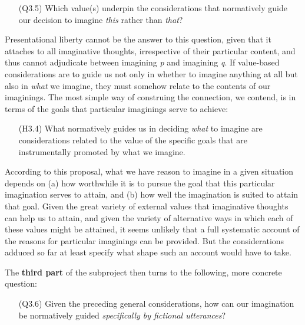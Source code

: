 \vspace{-.1cm}
\begin{itemize}[leftmargin=2cm]
\item[(Q3.5)] Which value(s) underpin the considerations that normatively guide our decision to imagine \emph{this} rather than \emph{that}?
\end{itemize}
\vspace{-.1cm}

\noindent Presentational liberty cannot be the answer to this question, given that it attaches to all imaginative thoughts, irrespective of their particular content, and thus cannot adjudicate between imagining \emph{p} and imagining \emph{q}. If value-based considerations are to guide us not only in whether to imagine anything at all but also in \emph{what} we imagine, they must somehow relate to the contents of our imaginings. The most simple way of construing the connection, we contend, is in terms of the goals that particular imaginings serve to achieve:

\vspace{-.1cm}
\begin{itemize}[leftmargin=2cm]
\item[(H3.4)] What normatively guides us in deciding \emph{what} to imagine are considerations related to the value of the specific goals that are instrumentally promoted by what we imagine.
\end{itemize}
\vspace{-.1cm}

\noindent According to this proposal, what we have reason to imagine in a given situation depends on (a) how worthwhile it is to pursue the goal that this particular imagination serves to attain, and (b) how well the imagination is suited to attain that goal. Given the great variety of external values that imaginative thoughts can help us to attain, and given the variety of alternative ways in which each of these values might be attained, it seems unlikely that a full systematic account of the reasons for particular imaginings can be provided. But the considerations adduced so far at least specify what shape such an account would have to take.

The \textbf{third part} of the subproject then turns to the following, more concrete question:

\vspace{-.1cm}
\begin{itemize}[leftmargin=2cm]
\item[(Q3.6)] Given the preceding general considerations, how can our imagination be normatively guided \emph{specifically by fictional utterances}?
\end{itemize}
\vspace{-.1cm}
 
